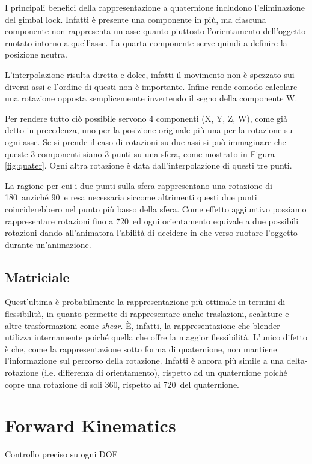 I principali benefici della rappresentazione a quaternione includono l'eliminazione del gimbal lock. Infatti è presente una componente in più, ma ciascuna componente non rappresenta un asse quanto piuttosto l'orientamento dell'oggetto ruotato intorno a quell'asse. La quarta componente serve quindi a definire la posizione neutra.

L'interpolazione risulta diretta e dolce, infatti il movimento non è spezzato sui diversi assi e l'ordine di questi non è importante. Infine rende comodo calcolare una rotazione opposta semplicememte invertendo il segno della componente W.

Per rendere tutto ciò possibile servono 4 componenti (X, Y, Z, W), come già detto in precedenza, uno per la posizione originale più una per la rotazione su ogni asse. Se si prende il caso di rotazioni su due assi si può immaginare che queste 3 componenti siano 3 punti su una sfera, come mostrato in Figura \ref{fig:quater}. Ogni altra rotazione è data dall'interpolazione di questi tre punti.

La ragione per cui i due punti sulla sfera rappresentano una rotazione di 180\textdegree\ anziché 90\textdegree\ e resa necessaria siccome altrimenti questi due punti coinciderebbero nel punto più basso della sfera. Come effetto aggiuntivo possiamo rappresentare rotazioni fino a 720\textdegree\ ed ogni orientamento equivale a due possibili rotazioni dando all'animatora l'abilità di decidere in che verso ruotare l'oggetto durante un'animazione. 

\subsection{Matriciale}
Quest'ultima è probabilmente la rappresentazione più ottimale in termini di flessibilità, in quanto permette di rappresentare anche traslazioni, scalature e altre trasformazioni come \emph{shear}. È, infatti, la rappresentazione che blender utilizza internamente \cite{blendApi} \cite{nat2012rig} poiché quella che offre la maggior flessibilità. L'unico difetto è che, come la rappresentazione sotto forma di quaternione, non mantiene l'informazione sul percorso della rotazione. Infatti è ancora più simile a una delta-rotazione (i.e. differenza di orientamento), rispetto ad un quaternione poiché copre una rotazione di soli 360\textdegree, rispetto ai 720\textdegree\ del quaternione. 


\section{Forward Kinematics}
Controllo preciso su ogni DOF

